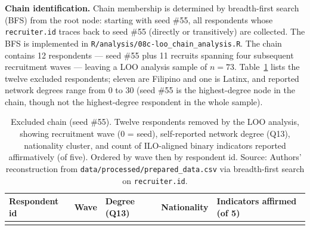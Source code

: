 \documentclass[
  12pt,
  letterpaper,
  DIV=11,
  numbers=noendperiod]{scrreprt}
\begin{document}
\textbf{Chain identification.} Chain membership is determined by
breadth-first search (BFS) from the root node: starting with seed \#55,
all respondents whose \texttt{recruiter.id} traces back to seed \#55
(directly or transitively) are collected. The BFS is implemented in
\texttt{R/analysis/08c-loo\_chain\_analysis.R}. The chain contains 12
respondents --- seed \#55 plus 11 recruits spanning four subsequent
recruitment waves --- leaving a LOO analysis sample of \(n = 73\).
Table~\ref{tbl-loo-chain} lists the twelve excluded respondents; eleven
are Filipino and one is Latinx, and reported network degrees range from
0 to 30 (seed \#55 is the highest-degree node in the chain, though not
the highest-degree respondent in the whole sample).

\begin{longtable}[]{@{}
  >{\raggedright\arraybackslash}p{}
  >{\raggedright\arraybackslash}p{}
  >{\raggedright\arraybackslash}p{}
  >{\raggedright\arraybackslash}p{}
  >{\raggedright\arraybackslash}p{}@{}}
\caption{Excluded chain (seed \#55). Twelve respondents removed by the
LOO analysis, showing recruitment wave (0 = seed), self-reported network
degree (Q13), nationality cluster, and count of ILO-aligned binary
indicators reported affirmatively (of five). Ordered by wave then by
respondent id. Source: Authors' reconstruction from
\texttt{data/processed/prepared\_data.csv} via breadth-first search on
\texttt{recruiter.id}.}\label{tbl-loo-chain}\tabularnewline
\toprule\noalign{}
\begin{minipage}[b]{\linewidth}\raggedright
Respondent id
\end{minipage} & \begin{minipage}[b]{\linewidth}\raggedright
Wave
\end{minipage} & \begin{minipage}[b]{\linewidth}\raggedright
Degree (Q13)
\end{minipage} & \begin{minipage}[b]{\linewidth}\raggedright
Nationality
\end{minipage} & \begin{minipage}[b]{\linewidth}\raggedright
Indicators affirmed (of 5)
\end{minipage} \\
\midrule\noalign{}
\endfirsthead
\toprule\noalign{}
\begin{minipage}[b]{\linewidth}\raggedright

\end{minipage}
\end{longtable}
\end{document}
